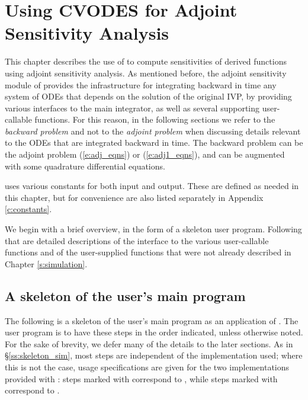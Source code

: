 \chapter{Using CVODES for Adjoint Sensitivity Analysis}\label{s:adjoint}

This chapter describes the use of {\cvodes} to compute sensitivities of derived 
functions using adjoint sensitivity analysis. As mentioned before, the adjoint
sensitivity module of {\cvodes} provides the infrastructure for integrating
backward in time any system of ODEs that depends on the solution of the original
IVP, by providing various interfaces to the main {\cvodes} integrator, as well 
as several supporting user-callable functions. For this reason, in the following
sections we refer to the {\em backward problem} and not to the 
{\em adjoint problem} when discussing details relevant to the ODEs that
are integrated backward in  time. The backward problem can be the adjoint problem
(\ref{e:adj_eqns}) or (\ref{e:adj1_eqns}), and
can be augmented with some quadrature differential equations.

{\cvodes} uses various constants for both input and output.  These are
defined as needed in this chapter, but for convenience are also listed
separately in Appendix \ref{c:constants}.

We begin with a brief overview, in the form of a skeleton user program.
Following that are detailed descriptions of the interface to the
various user-callable functions and of the user-supplied functions that were not already
described in Chapter \ref{s:simulation}.

\section{A skeleton of the user's main program}
\label{ss:skeleton_adj}

The following is a skeleton of the user's main program as an application of
{\cvodes}. The user program is to have these steps in the order indicated, 
unless otherwise noted. For the sake of brevity, we defer many of the details to 
the later sections.
As in \S\ref{ss:skeleton_sim}, most steps are independent of the {\nvector}
implementation used; where this is not the case, usage specifications are given for the
two implementations provided with {\cvodes}: steps marked with {\p} correspond to 
{\nvecp}, while steps marked with {\s} correspond to {\nvecs}.


